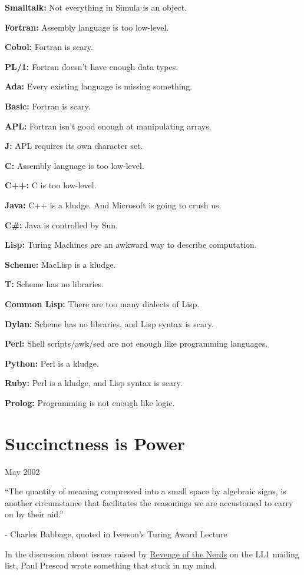 \documentclass[12pt]{book}
\begin{document}
\textbf{Smalltalk:} Not everything in Simula is an object.

\textbf{Fortran:} Assembly language is too low-level.

\textbf{Cobol:} Fortran is scary.

\textbf{PL/1:} Fortran doesn't have enough data types.

\textbf{Ada:} Every existing language is missing something.

\textbf{Basic:} Fortran is scary.

\textbf{APL:} Fortran isn't good enough at manipulating arrays.

\textbf{J:} APL requires its own character set.

\textbf{C:} Assembly language is too low-level.

\textbf{C++:} C is too low-level.

\textbf{Java:} C++ is a kludge. And Microsoft is going to crush us.

\textbf{C\#:} Java is controlled by Sun.

\textbf{Lisp:} Turing Machines are an awkward way to describe
computation.

\textbf{Scheme:} MacLisp is a kludge.

\textbf{T:} Scheme has no libraries.

\textbf{Common Lisp:} There are too many dialects of Lisp.

\textbf{Dylan:} Scheme has no libraries, and Lisp syntax is scary.

\textbf{Perl:} Shell scripts/awk/sed are not enough like programming
languages.

\textbf{Python:} Perl is a kludge.

\textbf{Ruby:} Perl is a kludge, and Lisp syntax is scary.

\textbf{Prolog:} Programming is not enough like logic.
\chapter{Succinctness is Power}

May 2002

``The quantity of meaning compressed into a small space by algebraic
signs, is another circumstance that facilitates the reasonings we are
accustomed to carry on by their aid.''

- Charles Babbage, quoted in Iverson's Turing Award Lecture

In the discussion about issues raised by \href{icad.html}{Revenge of the
Nerds} on the LL1 mailing list, Paul Prescod wrote something that stuck
in my mind.
\end{document}
